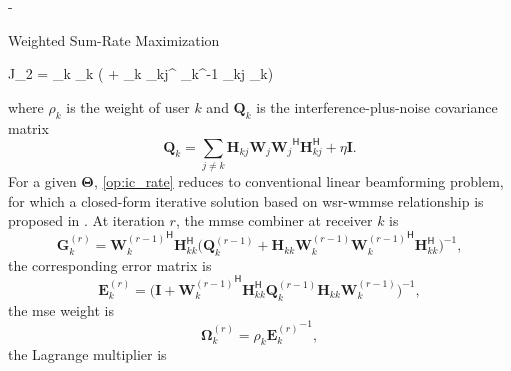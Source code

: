 \documentclass[journal]{IEEEtran}
\begin{document}
\begin{section}{-}
	\begin{subsection}{Weighted Sum-Rate Maximization}
		\begin{maxi!}
			{}{J_2 = \sum_k \rho_k \log \det \biggl( + _k _{kj}^ _k^{-1} _{kj} _k\biggr)}{\label{op:ic_rate}}{\label{ob:ic_rate}}
		\end{maxi!}
		where $\rho_k$ is the weight of user $k$ and $\mathbf{Q}_k$ is the interference-plus-noise covariance matrix
		\begin{equation}
			\mathbf{Q}_k = \sum_{j \ne k} \mathbf{H}_{kj} \mathbf{W}_j {\mathbf{W}_j}^\mathsf{H} \mathbf{H}_{kj}^\mathsf{H} + \eta \mathbf{I}.
		\end{equation}
		For a given $\mathbf{\Theta}$, \eqref{op:ic_rate} reduces to conventional linear beamforming problem, for which a closed-form iterative solution based on \gls{wsr}-\gls{wmmse} relationship is proposed in \cite{Negro2010}.
		At iteration $r$, the \gls{mmse} combiner at receiver $k$ is
		\begin{equation}
			\mathbf{G}_k^{(r)} = {\mathbf{W}_k^{(r-1)}}^\mathsf{H} \mathbf{H}_{kk}^\mathsf{H} \bigl(\mathbf{Q}_k^{(r-1)} + \mathbf{H}_{kk} \mathbf{W}_k^{(r-1)} {\mathbf{W}_k^{(r-1)}}^\mathsf{H} \mathbf{H}_{kk}^\mathsf{H}\bigr)^{-1},
		\end{equation}
		the corresponding error matrix is
		\begin{equation}
			\mathbf{E}_k^{(r)} = \bigl(\mathbf{I} + {\mathbf{W}_k^{(r-1)}}^\mathsf{H} \mathbf{H}_{kk}^\mathsf{H} \mathbf{Q}_k^{(r-1)} \mathbf{H}_{kk} \mathbf{W}_k^{(r-1)}\bigr)^{-1},
		\end{equation}
		the \gls{mse} weight is
		\begin{equation}
			\mathbf{\Omega}_k^{(r)} = \rho_k {\mathbf{E}_k^{(r)}}^{-1},
		\end{equation}
		the Lagrange multiplier is

\end{subsection}
\end{section}
\end{document}
